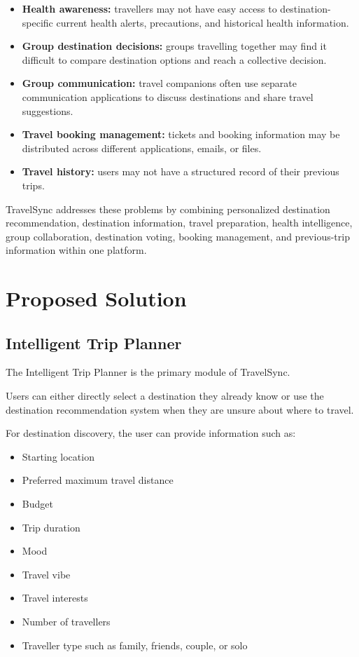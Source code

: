 \documentclass[11pt,a4paper]{article}
\begin{document}
\begin{itemize}
\item \textbf{Health awareness:} travellers may not have easy access to destination-specific current health alerts, precautions, and historical health information.

\item \textbf{Group destination decisions:} groups travelling together may find it difficult to compare destination options and reach a collective decision.

\item \textbf{Group communication:} travel companions often use separate communication applications to discuss destinations and share travel suggestions.

\item \textbf{Travel booking management:} tickets and booking information may be distributed across different applications, emails, or files.

\item \textbf{Travel history:} users may not have a structured record of their previous trips.

\end{itemize}

TravelSync addresses these problems by combining personalized destination recommendation, destination information, travel preparation, health intelligence, group collaboration, destination voting, booking management, and previous-trip information within one platform.



\section{Proposed Solution}

\subsection{Intelligent Trip Planner}

The Intelligent Trip Planner is the primary module of TravelSync.

Users can either directly select a destination they already know or use the destination recommendation system when they are unsure about where to travel.

For destination discovery, the user can provide information such as:

\begin{itemize}
\item Starting location
\item Preferred maximum travel distance
\item Budget
\item Trip duration
\item Mood
\item Travel vibe
\item Travel interests
\item Number of travellers
\item Traveller type such as family, friends, couple, or solo
\end{itemize}
\end{document}
